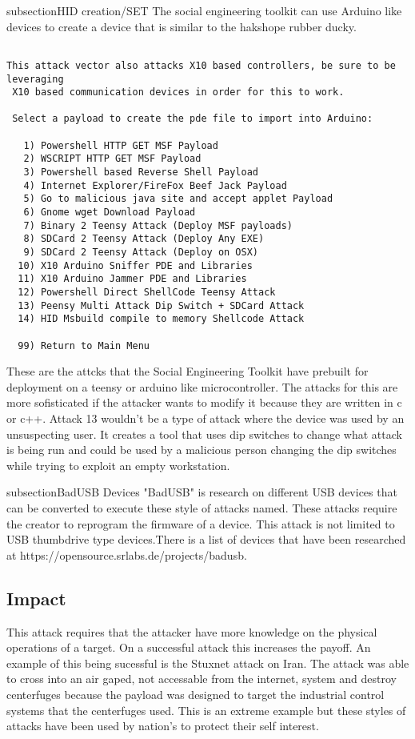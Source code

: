 subsection{HID creation/SET}
The social engineering toolkit can use Arduino like devices to create a device that is similar to the hakshope rubber ducky. 
\begin{verbatim}

This attack vector also attacks X10 based controllers, be sure to be leveraging
 X10 based communication devices in order for this to work.

 Select a payload to create the pde file to import into Arduino:

   1) Powershell HTTP GET MSF Payload
   2) WSCRIPT HTTP GET MSF Payload
   3) Powershell based Reverse Shell Payload
   4) Internet Explorer/FireFox Beef Jack Payload
   5) Go to malicious java site and accept applet Payload
   6) Gnome wget Download Payload
   7) Binary 2 Teensy Attack (Deploy MSF payloads)
   8) SDCard 2 Teensy Attack (Deploy Any EXE)
   9) SDCard 2 Teensy Attack (Deploy on OSX)
  10) X10 Arduino Sniffer PDE and Libraries
  11) X10 Arduino Jammer PDE and Libraries
  12) Powershell Direct ShellCode Teensy Attack
  13) Peensy Multi Attack Dip Switch + SDCard Attack
  14) HID Msbuild compile to memory Shellcode Attack

  99) Return to Main Menu

\end{verbatim}

These are the attcks that the Social Engineering Toolkit have prebuilt for deployment on a teensy or arduino like microcontroller. The attacks for this are more sofisticated if the attacker wants to modify it because they are written in c or c++. Attack 13 wouldn't be a type of attack where the device was used by an unsuspecting user. It creates a tool that uses dip switches to change what attack is being run and could be used by a malicious person changing the dip switches while trying to exploit an empty workstation. 

subsection{BadUSB Devices}
"BadUSB" is research on different USB devices that can be converted to execute these style of attacks named. These attacks require the creator to reprogram the firmware of a device. This attack is not limited to USB thumbdrive type devices.There is a list of devices that have been researched at https://opensource.srlabs.de/projects/badusb.  

\subsection{Impact}
This attack requires that the attacker have more knowledge on the physical operations of a target. On a successful attack this increases the payoff. An example of this being sucessful is the Stuxnet attack on Iran. The attack was able to cross into an air gaped, not accessable from the internet, system and destroy centerfuges because the payload was designed to target the industrial control systems that the centerfuges used. This is an extreme example but these styles of attacks have been used by nation's to protect their self interest.\\


